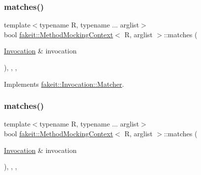 \subsubsection{\texorpdfstring{matches()}{matches()}\hspace{0.1cm}{\footnotesize\ttfamily [2/9]}}
{\footnotesize\ttfamily template$<$typename R, typename ... arglist$>$ \\
bool \mbox{\hyperlink{classfakeit_1_1MethodMockingContext}{fakeit\+::\+Method\+Mocking\+Context}}$<$ R, arglist $>$\+::matches (\begin{DoxyParamCaption}\item[{\mbox{\hyperlink{structfakeit_1_1Invocation}{Invocation}} \&}]{invocation }\end{DoxyParamCaption})\hspace{0.3cm}{\ttfamily [inline]}, {\ttfamily [override]}, {\ttfamily [protected]}, {\ttfamily [virtual]}}



Implements \mbox{\hyperlink{structfakeit_1_1Invocation_1_1Matcher_a77b45c801fe29889c148516df1ffcb06}{fakeit\+::\+Invocation\+::\+Matcher}}.

\mbox{\label{classfakeit_1_1MethodMockingContext_a240fe9e15cffcebd52f5b0c9ccf87654}} 
\subsubsection{\texorpdfstring{matches()}{matches()}\hspace{0.1cm}{\footnotesize\ttfamily [3/9]}}
{\footnotesize\ttfamily template$<$typename R, typename ... arglist$>$ \\
bool \mbox{\hyperlink{classfakeit_1_1MethodMockingContext}{fakeit\+::\+Method\+Mocking\+Context}}$<$ R, arglist $>$\+::matches (\begin{DoxyParamCaption}\item[{\mbox{\hyperlink{structfakeit_1_1Invocation}{Invocation}} \&}]{invocation }\end{DoxyParamCaption})\hspace{0.3cm}{\ttfamily [inline]}, {\ttfamily [override]}, {\ttfamily [protected]}, {\ttfamily [virtual]}}



